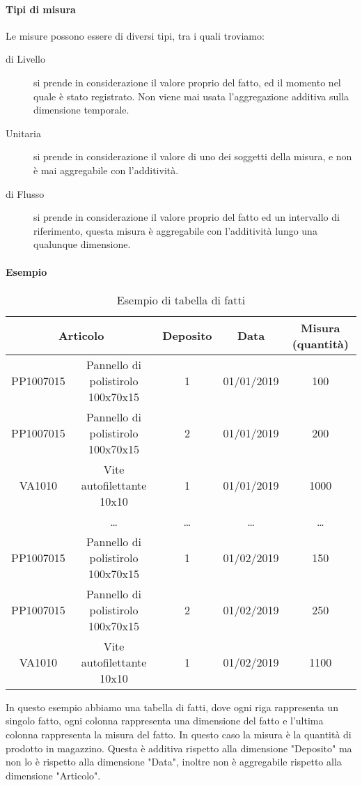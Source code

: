         \paragraph{Tipi di misura} Le misure possono essere di diversi tipi, tra i quali troviamo:
        \begin{description}
            \item[di Livello] si prende in considerazione il valore proprio del fatto, ed il momento nel quale è stato registrato. Non viene mai usata l'aggregazione additiva sulla dimensione temporale.
            \item[Unitaria] si prende in considerazione il valore di uno dei soggetti della misura, e non è mai aggregabile con l'additività.
            \item[di Flusso] si prende in considerazione il valore proprio del fatto ed un intervallo di riferimento, questa misura è aggregabile con l'additività lungo una qualunque dimensione.
        \end{description}
        \paragraph{Esempio}
        \begin{table}[H]
            \begin{tabular}{|c|c|c|c|c|}
                \hline
            \multicolumn{2}{|c|}{\textbf{Articolo}} & \textbf{Deposito} & \textbf{Data} & \textbf{Misura (quantità)} \\ \hline
            PP1007015 & Pannello di polistirolo 100x70x15 & 1 & 01/01/2019 & 100 \\ \hline
            PP1007015 & Pannello di polistirolo 100x70x15 & 2 & 01/01/2019 & 200 \\ \hline
            VA1010 & Vite autofilettante 10x10 & 1 & 01/01/2019 & 1000 \\ \hline
            &\dots&\dots&\dots&\dots\\ \hline
            PP1007015 & Pannello di polistirolo 100x70x15 & 1 & 01/02/2019 & 150 \\ \hline
            PP1007015 & Pannello di polistirolo 100x70x15 & 2 & 01/02/2019 & 250 \\ \hline
            VA1010 & Vite autofilettante 10x10 & 1 & 01/02/2019 & 1100 \\ \hline
            \end{tabular}
            \caption{Esempio di tabella di fatti}
        \end{table}
        In questo esempio abbiamo una tabella di fatti, dove ogni riga rappresenta un singolo fatto, ogni colonna rappresenta una dimensione del fatto e l'ultima colonna rappresenta la misura del fatto. In questo caso la misura è la quantità di prodotto in magazzino. Questa è additiva rispetto alla dimensione "Deposito" ma non lo è rispetto alla dimensione "Data", inoltre non è aggregabile rispetto alla dimensione "Articolo".
